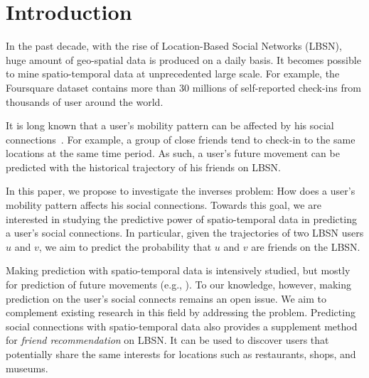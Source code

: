 \section{Introduction}\label{sec:intro}

In the past decade, with the rise of Location-Based Social Networks (LBSN), huge amount of geo-spatial data is produced on a daily basis. It becomes possible to mine spatio-temporal data at unprecedented large scale. For example, the Foursquare\cite{yang2015nationtelescope} dataset contains more than 30 millions of self-reported check-ins from thousands of user around the world. 

It is long known that a user's mobility pattern can be affected by his social connections~\cite{cho2011friendship, ye2013s}. For example, a group of close friends tend to check-in to the same locations at the same time period. As such, a user's future movement can be predicted with the historical trajectory of his friends on LBSN. 

In this paper, we propose to investigate the inverses problem: How does a user's mobility pattern affects his social connections. Towards this goal, we are interested in studying the predictive power of spatio-temporal data in predicting a user's social connections. In particular, given the trajectories of two LBSN users $u$ and $v$, we aim to predict the probability that $u$ and $v$ are friends on the LBSN.

Making prediction with spatio-temporal data is intensively studied, but mostly for prediction of future movements (e.g., \cite{cho2011friendship, noulas2012mining, gao2012mobile, scellato2011nextplace, lian2013collaborative}). To our knowledge, however, making prediction on the user's social connects remains an open issue. We aim to complement existing research in this field by addressing the problem. Predicting social connections with spatio-temporal data also provides a supplement method for \textit{friend recommendation} on LBSN. It can be used to discover users that potentially share the same interests for locations such as restaurants, shops, and museums.

